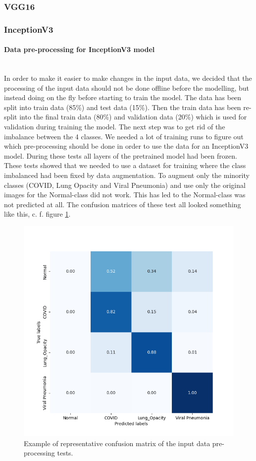 \documentclass{article}
\begin{document}
\subsubsection{VGG16}


\subsubsection{InceptionV3}
\paragraph{Data pre-processing for InceptionV3 model}\mbox{}\\
In order to make it easier to make changes in the input data, we decided that the processing of the input data should not be done offline before the modelling, but instead doing on the fly before starting to train the model. 
The data has been split into train data (85\%) and test data (15\%). Then the train data has been re-split into the final train data (80\%) and validation data (20\%) which is used for validation during training the model. 
The next step was to get rid of the imbalance between the 4 classes. We needed a lot of training runs to figure out which pre-processing should be done in order to use the data for an InceptionV3 model. During these tests all layers of the pretrained model had been frozen. 
These tests showed that we needed to use a dataset for training where the class imbalanced had been fixed by data augmentation. To augment only the minority classes (COVID, Lung Opacity and Viral Pneumonia) and use only the original images for the Normal-class did not work. This has led to the Normal-class was not predicted at all. The confusion matrices of these test all looked something like this, c. f. figure \ref{fig:vgg16_yb_03_cm_norm.png}.
\begin{figure}%
    \centering
    \includegraphics[width=0.5\linewidth]{vgg16_yb_03_cm_norm.png}
    \caption{Example of representative confusion matrix of the input data pre-processing tests.}
    \label{fig:vgg16_yb_03_cm_norm.png}
\end{figure}
\end{document}

